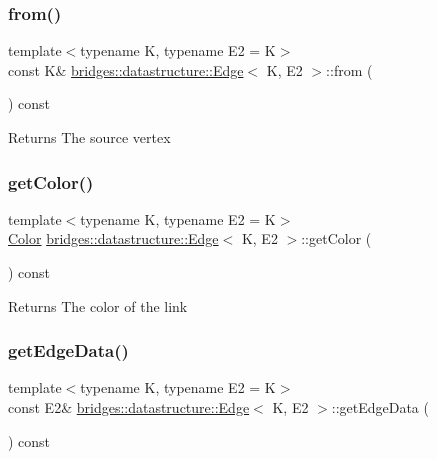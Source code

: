 \subsubsection{\texorpdfstring{from()}{from()}}
{\footnotesize\ttfamily template$<$typename K, typename E2 = K$>$ \\
const K\& \mbox{\hyperlink{classbridges_1_1datastructure_1_1_edge}{bridges\+::datastructure\+::\+Edge}}$<$ K, E2 $>$\+::from (\begin{DoxyParamCaption}{ }\end{DoxyParamCaption}) const\hspace{0.3cm}{\ttfamily [inline]}}

\begin{DoxyReturn}{Returns}
The source vertex 
\end{DoxyReturn}
\mbox{\label{classbridges_1_1datastructure_1_1_edge_abb5c66b734e1ac71e5d4e012908ec7a4}} 
\subsubsection{\texorpdfstring{get\+Color()}{getColor()}}
{\footnotesize\ttfamily template$<$typename K, typename E2 = K$>$ \\
\mbox{\hyperlink{classbridges_1_1datastructure_1_1_color}{Color}} \mbox{\hyperlink{classbridges_1_1datastructure_1_1_edge}{bridges\+::datastructure\+::\+Edge}}$<$ K, E2 $>$\+::get\+Color (\begin{DoxyParamCaption}{ }\end{DoxyParamCaption}) const\hspace{0.3cm}{\ttfamily [inline]}}

\begin{DoxyReturn}{Returns}
The color of the link 
\end{DoxyReturn}
\mbox{\label{classbridges_1_1datastructure_1_1_edge_a4769b5d8fc74522f77f5927b230ced7b}} 
\subsubsection{\texorpdfstring{get\+Edge\+Data()}{getEdgeData()}\hspace{0.1cm}{\footnotesize\ttfamily [1/2]}}
{\footnotesize\ttfamily template$<$typename K, typename E2 = K$>$ \\
const E2\& \mbox{\hyperlink{classbridges_1_1datastructure_1_1_edge}{bridges\+::datastructure\+::\+Edge}}$<$ K, E2 $>$\+::get\+Edge\+Data (\begin{DoxyParamCaption}{ }\end{DoxyParamCaption}) const\hspace{0.3cm}{\ttfamily [inline]}}

